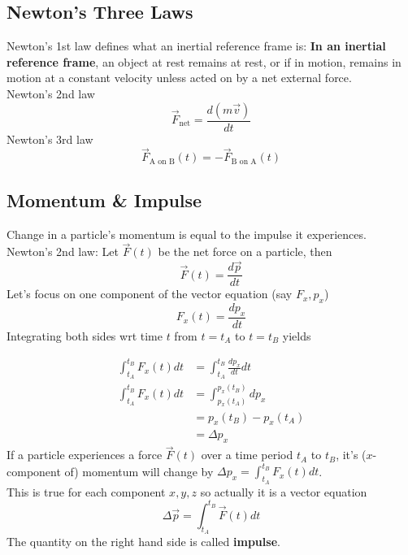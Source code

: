\documentclass{article}
\begin{document}
\subsection{Newton's Three Laws}
Newton's 1st law defines what an inertial reference frame is: \textbf{In an inertial reference frame}, an object at rest remains at rest, or if in motion, remains in motion at a constant velocity unless acted on by a net external force.\\[10pt]
Newton's 2nd law
$$\vec{F}_{\text{net}} = \frac{d(m\vec{v})}{dt}$$
Newton's 3rd law 
$$\vec{F}_{\text{A on B}}(t) = -\vec{F}_{\text{B on A}}(t)$$

\subsection{Momentum \& Impulse}
Change in a particle's momentum is equal to the impulse it experiences. \\[10pt]
Newton's 2nd law: Let $\vec{F}(t)$ be the net force on a particle, then
$$\vec{F}(t) = \frac{d\vec{p}}{dt}$$
Let's focus on one component of the vector equation (say $F_x, p_x$)
$$F_x(t) = \frac{dp_x}{dt}$$
Integrating both sides wrt time $t$ from $t=t_A$ to $t=t_B$ yields

\begin{align}
    \int_{t_A}^{t_B} F_x(t) dt &= \int_{t_A}^{t_B} \frac{dp_x}{dt} dt \\
    \int_{t_A}^{t_B} F_x(t) dt &= \int_{p_x(t_A)}^{p_x(t_B)} dp_x \\
    &= p_x(t_B) - p_x(t_A) \\
    &= \Delta p_x
\end{align}
If a particle experiences a force $\vec{F}(t)$ over a time period $t_A$ to $t_B$, it's ($x$-component of) momentum will change by $\Delta p_x = \int_{t_A}^{t_B} F_x(t) dt$.\\[10pt]
This is true for each component $x,y,z$ so actually it is a vector equation 
$$\Delta \vec{p} = \int_{t_A}^{t_B} \vec{F}(t) dt$$
The quantity on the right hand side is called \textbf{impulse}.
\end{document}
